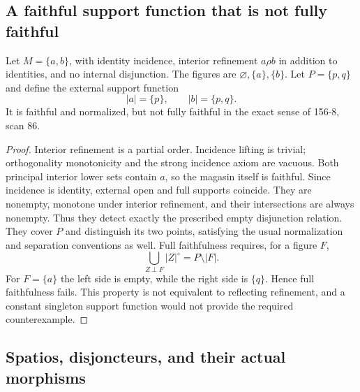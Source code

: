 \subsection{A faithful support function that is not fully faithful}

\begin{counterexample}\label{SA21-A20}
Let $M=\{a,b\}$, with identity incidence, interior refinement
$a\rho b$ in addition to identities, and no internal disjunction.
The figures are $\varnothing,\{a\},\{b\}$.
Let $P=\{p,q\}$ and define the external support function
\[
 |a|=\{p\},\qquad |b|=\{p,q\}.
\]
It is faithful and normalized, but not fully faithful in the exact
sense of 156-8, scan 86.
\end{counterexample}
\begin{proof}
Interior refinement is a partial order. Incidence lifting is trivial;
orthogonality monotonicity and the strong incidence axiom are
vacuous. Both principal interior lower sets contain $a$, so the
magasin itself is faithful. Since incidence is identity, external
open and full supports coincide. They are nonempty, monotone under
interior refinement, and their intersections are always nonempty.
Thus they detect exactly the prescribed empty disjunction relation.
They cover $P$ and distinguish its two points, satisfying the usual
normalization and separation conventions as well.
Full faithfulness requires, for a figure $F$,
\[
 \bigcup_{Z\perp F}|Z|^\circ=P\setminus|F|.
\]
For $F=\{a\}$ the left side is empty, while the right side is
$\{q\}$. Hence full faithfulness fails. This property is not
equivalent to reflecting refinement, and a constant singleton
support function would not provide the required counterexample.
\end{proof}

\subsection{Spatios, disjoncteurs, and their actual morphisms}


